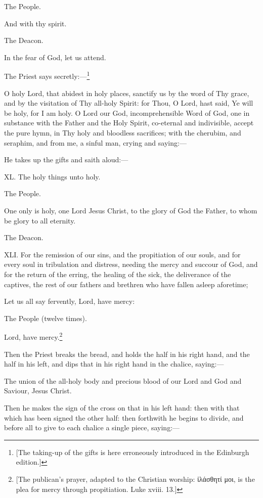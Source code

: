The People.

And with thy spirit.

The Deacon.

In the fear of God, let us attend.

The Priest says secretly:—\footnote{\par{}  [The taking-up of the gifts is here erroneously introduced in the Edinburgh edition.]}

O holy Lord, that abidest in holy places, sanctify us by the word of Thy grace, and by the visitation of Thy all-holy Spirit: for Thou, O Lord, hast said, Ye will be holy, for I am holy. O Lord our God, incomprehensible Word of God, one in substance with the Father and the Holy Spirit, co-eternal and indivisible, accept the pure hymn, in Thy holy and bloodless sacrifices; with the cherubim, and seraphim, and from me, a sinful man, crying and saying:—

He takes up the gifts and saith aloud:—

XL. The holy things unto holy.

The People.

One only is holy, one Lord Jesus Christ, to the glory of God the Father, to whom be glory to all eternity.

The Deacon.

XLI. For the remission of our sins, and the propitiation of our souls, and for every soul in tribulation and distress, needing the mercy and succour of God, and for the return of the erring, the healing of the sick, the deliverance of the captives, the rest of our fathers and brethren who have fallen asleep aforetime;

Let us all say fervently, Lord, have mercy:

The People (twelve times).

Lord, have mercy.\footnote{\par{}  [The publican’s prayer, adapted to the Christian worship: \textgreek{ἰλάσθητί μοι}, is the plea for mercy through propitiation. Luke xviii. 13.]}

Then the Priest breaks the bread, and holds the half in his right hand, and the half in his left, and dips that in his right hand in the chalice, saying:—

The union of the all-holy body and precious blood of our Lord and God and Saviour, Jesus Christ.

Then he makes the sign of the cross on that in his left hand: then with that which has been signed the other half: then forthwith he begins to divide, and before all to give to each chalice a single piece, saying:—

